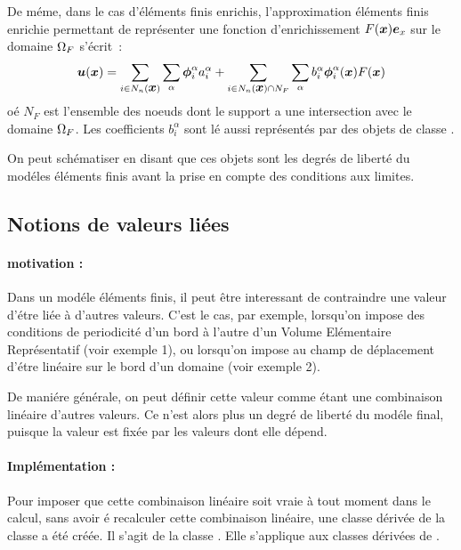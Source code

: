 De m\'eme, dans le cas d'\'el\'ements finis enrichis, l'approximation
\'el\'ements finis enrichie
 permettant de repr\'esenter une fonction d'enrichissement $F(\mbox{\boldmath $x$}) \mbox{\boldmath $e$}_x$ sur le
domaine ${\Omega}_F$ s'\'ecrit~:
\begin{equation}
  \label{eq:approx_ef_enrichi_2}
  \mbox{\boldmath $u$}(\mbox{\boldmath $x$})  = \sum_{i \in N_n(\mbox{\boldmath $x$})} \sum_{\alpha} \mbox{\boldmath $\phi$}_i^\alpha a_i^\alpha   +
  \sum_{i \in N_n(\mbox{\boldmath $x$}) \cap N_F}
  \sum_{\alpha} b_i^\alpha \mbox{\boldmath $\phi$}_i^\alpha(\mbox{\boldmath $x$}) F(\mbox{\boldmath $x$})
\end{equation}
o\'e $N_F$ est l'ensemble des noeuds dont le support a une
intersection avec le domaine ${\Omega}_F$. Les coefficients $b_i^\alpha$
sont l\'e aussi repr\'esent\'es par des objets de classe
.


On peut sch\'ematiser en disant que ces objets sont les degr\'es de
libert\'e du mod\'eles \'el\'ements finis avant la prise en compte des
conditions aux limites.









\subsection{Notions de valeurs li\'ees}

\paragraph*{motivation : }
Dans un mod\'ele \'el\'ements finis, il peut \^etre interessant de
contraindre une valeur d'\'etre li\'ee \`a d'autres valeurs. C'est le cas,
par exemple, lorsqu'on impose des conditions de periodicit\'e d'un
bord \`a l'autre d'un Volume El\'ementaire Repr\'esentatif (voir exemple
1), ou lorsqu'on impose au champ de d\'eplacement d'\'etre lin\'eaire sur
le bord d'un domaine (voir exemple 2).

De mani\'ere g\'en\'erale, on peut d\'efinir cette valeur comme \'etant une
combinaison lin\'eaire d'autres valeurs. Ce n'est alors plus un degr\'e
de libert\'e du mod\'ele final, puisque la valeur est fix\'ee par les
valeurs dont elle d\'epend.



\paragraph*{Impl\'ementation :}
Pour imposer que cette combinaison lin\'eaire  soit vraie \`a tout moment dans le calcul, sans avoir \'e
recalculer cette combinaison lin\'eaire,  une classe d\'eriv\'ee de la
classe  a \'et\'e cr\'e\'ee. Il s'agit de la classe
. Elle s'applique aux classes
d\'eriv\'ees de .

